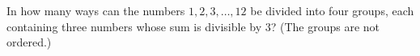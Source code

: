 In how many ways can the numbers $1,2,3,\dots,12$ be divided into four groups, each containing three numbers whose sum is divisible by $3$? (The groups are not ordered.)
